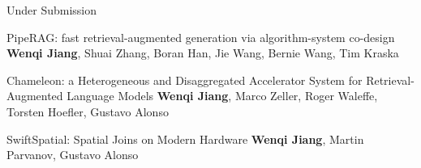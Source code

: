 

\begin{rSection}{Under Submission}
\begin{enumerate}[label={[\arabic*]}]

\item 
\begin{Pub}{PipeRAG: fast retrieval-augmented generation via algorithm-system co-design}
{\textbf{Wenqi Jiang}, Shuai Zhang, Boran Han, Jie Wang, Bernie Wang, Tim Kraska}
{}
\end{Pub}

\item 
\begin{Pub}{Chameleon: a Heterogeneous and Disaggregated Accelerator System for Retrieval-Augmented Language Models}
{\textbf{Wenqi Jiang}, Marco Zeller, Roger Waleffe, Torsten Hoefler, Gustavo Alonso}
{}
\end{Pub}

\item 
\begin{Pub}{SwiftSpatial: Spatial Joins on Modern Hardware}
{\textbf{Wenqi Jiang}, Martin Parvanov, Gustavo Alonso}
{}
\end{Pub}\end{enumerate}
\end{rSection}



